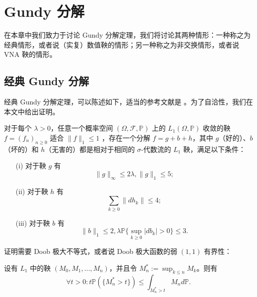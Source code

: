 \chapter{Gundy 分解}
在本章中我们致力于讨论 Gundy 分解定理，我们将讨论其两种情形：一种称之为经典情形，或者说（实复）数值鞅的情形；另一种称之为非交换情形，或者说 VNA 鞅的情形。
\section{经典 Gundy 分解}
经典 Gundy 分解定理，可以陈述如下，适当的参考文献是 \cite*{G}。为了自洽性，我们在本文中给出证明。
\begin{theorem}\label{Gundy;classical}
    对于每个 $\lambda>0$，任意一个概率空间 $(\Omega,\mathcal{F},\mathbb{P})$ 上的 $L_1(\Omega,\mathbb{P})$ 收敛的鞅 $f=(f_n)_{n\geq0}$ 适合 $\|f\|_{1}\leq 1$ ，存在一个分解 $f = g + b + h$，其中 $g$（好的）、$b$（坏的）和 $h$（无害的）都是相对于相同的 $\sigma$-代数流的 $L_1$ 鞅，满足以下条件：
    \begin{itemize}
        \item[(i)] 对于鞅 $g$ 有    \[\|g\|_\infty\leq 2\lambda, \|g\|_{1}\leq 5;\]
        \item[(ii)] 对于鞅 $h$ 有 \[\sum_{k\geq0}\|dh_k\|\leq 4;\]
        \item[(iii)] 对于鞅 $b$ 有 \[\|b\|_1\leq 2,\lambda \mathbb{P}\bigl\{\sup_{k\geq0}|db_k|>0\bigr\}\leq 3.\]
    \end{itemize}
\end{theorem}
证明需要 Doob 极大不等式，或者说 Doob 极大函数的弱 $(1,1)$ 有界性：
\begin{theorem}\cite{pisier2016martingales}
    设有 $L_1$ 中的鞅 $(M_0,M_1,\ldots,M_n)$，并且令 $M_n^\ast:=\sup_{k\leq n}M_k$。则有
        \[\forall t>0\colon t\mathbb{P}(\{M_n^\ast>t\})\leq\int_{M^\ast_{n}>t}M_nd\mathbb{P}.\]
\end{theorem}
